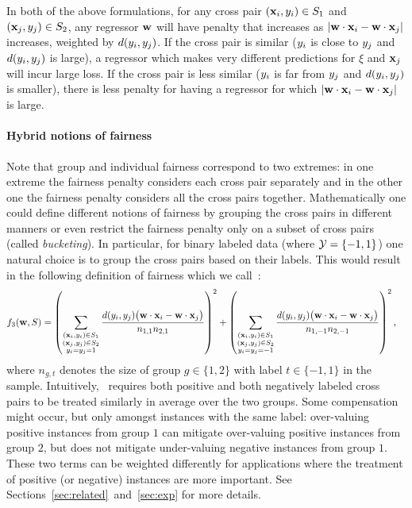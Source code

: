 In both of the above formulations, for any cross pair
$({\bf x}_{i},y_{i}) \in S_1$ and $({\bf x}_{j}, y_{j}) \in S_2$, any regressor $\mathbf{w}$ will
have penalty that increases as
$\left|\mathbf{w} \cdot {\bf x}_{i}-\mathbf{w} \cdot {\bf x}_{j}\right|$ increases, weighted by
$d(y_{i}, y_{j})$.  If the cross pair is similar ($y_{i}$ is close to $y_{j}$
and $d(y_{i}, y_{j})$ is large), a regressor which makes very different
predictions for $\xi$ and ${\bf x}_{j}$ will incur large loss. If the cross
pair is less similar ($y_{i}$ is far from $y_{j}$ and $d(y_{i},y_{j})$ is
smaller), there is less penalty for having a regressor for which
$\left|\mathbf{w} \cdot {\bf x}_{i}-\mathbf{w} \cdot {\bf x}_{j}\right|$ is large.

\paragraph{Hybrid notions of fairness}
Note that group and individual fairness correspond to two extremes: in
one extreme the fairness penalty considers each cross pair separately
and in the other one the fairness penalty considers all the cross
pairs together.  Mathematically one could define different notions of
fairness by grouping the cross pairs in different manners or even
restrict the fairness penalty only on a subset of cross pairs (called
\emph{bucketing}).  In particular, for binary labeled data (where
$\mathcal{Y} = \{-1,1\}$) one natural choice is to group the cross pairs based
on their labels.  This would result in the following definition of
fairness which we call~\hybrid:
\begin{align}
  f_3(\mathbf{w},S) &=
  \left(\sum_{\substack{({\bf x}_{i},y_{i}) \in S_{1}\\ ({\bf x}_{j},y_{j})\in S_{2}\\ y_{i}=y_{j}=1}}
  \frac{d(y_{i},y_{j}) \big(\mathbf{w}\cdot {\bf x}_{i}-\mathbf{w}\cdot {\bf x}_{j}\big)}{n_{1,1} n_{2,1}}\right)^2 + 
  \left( \sum_{\substack{({\bf x}_{i},y_{i}) \in S_{1}\\ ({\bf x}_{j},y_{j})\in S_{2} \\ y_{i}=y_{j}=-1}}
  \frac{d(y_{i},y_{j}) \big(\mathbf{w}\cdot {\bf x}_{i}-\mathbf{w}\cdot {\bf x}_{j}\big)}{n_{1,-1} n_{2,-1}}\right)^2,\label{eqn:betweensq}
\end{align}
where $n_{g,t}$ denotes the size of group $g\in\{1, 2\}$ with label
$t\in\{-1,1\}$ in the sample.  Intuitively, \hybrid~requires both
positive and both negatively labeled cross pairs to be treated
similarly in average over the two groups. Some compensation might
occur, but only amongst instances with the same label: over-valuing
positive instances from group $1$ can mitigate over-valuing positive
instances from group $2$, but does not mitigate under-valuing negative
instances from group $1$. These two terms can be weighted differently
for applications where the treatment of positive (or negative)
instances are more important.  See
Sections~\ref{sec:related}~and~\ref{sec:exp} for more details.

